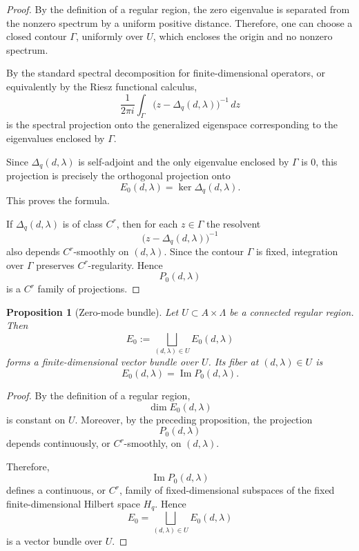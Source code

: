 \documentclass[pdflatex,sn-mathphys-num]{sn-jnl}%
\theoremstyle{thmstyleone}%
\newtheorem{proposition}[theorem]{Proposition}%
\theoremstyle{thmstyletwo}%
\theoremstyle{thmstylethree}%
\begin{document}
\begin{proof}
By the definition of a regular region, the zero eigenvalue is separated from the
nonzero spectrum by a uniform positive distance. Therefore, one can choose a
closed contour \(\Gamma\), uniformly over \(U\), which encloses the origin and no
nonzero spectrum.

By the standard spectral decomposition for finite-dimensional operators, or
equivalently by the Riesz functional calculus,
\[
\frac{1}{2\pi i}
\int_\Gamma
\bigl(z-\Delta_q(d,\lambda)\bigr)^{-1}\,dz
\]
is the spectral projection onto the generalized eigenspace corresponding to the
eigenvalues enclosed by \(\Gamma\).

Since \(\Delta_q(d,\lambda)\) is self-adjoint and the only eigenvalue enclosed by
\(\Gamma\) is \(0\), this projection is precisely the orthogonal projection onto
\[
E_0(d,\lambda)=\ker \Delta_q(d,\lambda).
\]
This proves the formula.

If \(\Delta_q(d,\lambda)\) is of class \(C^r\), then for each \(z\in\Gamma\) the
resolvent
\[
\bigl(z-\Delta_q(d,\lambda)\bigr)^{-1}
\]
also depends \(C^r\)-smoothly on \((d,\lambda)\). Since the contour \(\Gamma\) is
fixed, integration over \(\Gamma\) preserves \(C^r\)-regularity. Hence
\[
P_0(d,\lambda)
\]
is a \(C^r\) family of projections.
\end{proof}

\begin{proposition}[Zero-mode bundle]
Let \(U\subset A\times\Lambda\) be a connected regular region. Then
\[
E_0
:=
\bigsqcup_{(d,\lambda)\in U}E_0(d,\lambda)
\]
forms a finite-dimensional vector bundle over \(U\). Its fiber at
\((d,\lambda)\in U\) is
\[
E_0(d,\lambda)=\operatorname{Im}P_0(d,\lambda).
\]
\end{proposition}

\begin{proof}
By the definition of a regular region,
\[
\dim E_0(d,\lambda)
\]
is constant on \(U\). Moreover, by the preceding proposition, the projection
\[
P_0(d,\lambda)
\]
depends continuously, or \(C^r\)-smoothly, on \((d,\lambda)\).

Therefore,
\[
\operatorname{Im}P_0(d,\lambda)
\]
defines a continuous, or \(C^r\), family of fixed-dimensional subspaces of the
fixed finite-dimensional Hilbert space \(H_q\).
Hence
\[
E_0
=
\bigsqcup_{(d,\lambda)\in U}E_0(d,\lambda)
\]
is a vector bundle over \(U\).
\end{proof}
\end{document}
